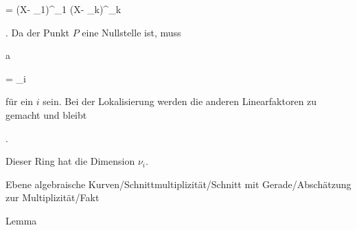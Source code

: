 {{{ 
}

{ =} { (X- \lambda_1)^{\nu_1 } \cdots (X- \lambda_k)^{\nu_k }
}

{ } {
}

{ } {
}

{ } {
}

}
{}{}{.}
Da der Punkt $P$ eine Nullstelle ist, muss


\mavergleichskette

{\vergleichskette

{ a
}

{ = }{ \lambda_i
}

{  }{
}

{    }{
}

{   }{
}

}
{}{}{}
für ein $i$ sein. Bei der Lokalisierung werden die anderen Linearfaktoren zu
gemacht und  bleibt


 { . }


Dieser Ring hat die Dimension $\nu_i$.


}



{Ebene algebraische Kurven/Schnittmultiplizität/Schnitt mit Gerade/Abschätzung zur Multiplizität/Fakt}

{Lemma}

{}

